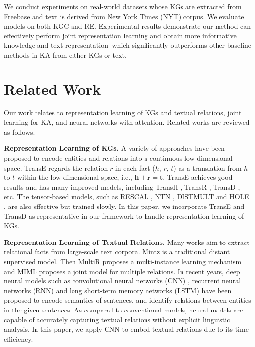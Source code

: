 \documentclass[letterpaper]{article} %
\begin{document}
We conduct experiments on real-world datasets whose KGs are extracted from Freebase and text is derived from New York Times (NYT) corpus. We evaluate models on both KGC and RE. Experimental results demonstrate our method can effectively perform joint representation learning and obtain more informative knowledge and text representation, which significantly outperforms other baseline methods in KA from either KGs or text.

\section{Related Work}
\label{sec:related}
Our work relates to representation learning of KGs and textual relations, joint learning for KA, and neural networks with attention. Related works are reviewed as follows.

\textbf{Representation Learning of KGs.} A variety of approaches have been proposed to encode entities and relations into a continuous low-dimensional space. TransE \cite{bordes2013translating} regards the relation $r$ in each fact ($h$, $r$, $t$) as a translation from $h$ to $t$ within the low-dimensional space, i.e., $\textbf{h} + \textbf{r} = \textbf{t}$. TransE achieves good results and has many improved models, including TransH \cite{wang2014transh}, TransR \cite{lin2015learning}, TransD \cite{ji2015knowledge}, etc. The tensor-based models, such as RESCAL \cite{nickel2011three}, NTN \cite{socher2013reasoning}, DISTMULT \cite{yang2015embedding} and HOLE \cite{nickel2016holographic}, are also effective but trained slowly. In this paper, we incorporate TransE and TransD as representative in our framework to handle representation learning of KGs. 

\textbf{Representation Learning of Textual Relations.} Many works aim to extract relational facts from large-scale text corpora. Mintz \cite{mintz2009distant} is a traditional distant supervised model. Then MultiR \cite{hoffmann2011knowledge} proposes a multi-instance learning mechanism and MIML \cite{surdeanu2012multi} proposes a joint model for multiple relations. In recent years, deep neural models such as convolutional neural networks (CNN) \cite{zeng2014relation,zeng2015distant}, recurrent neural networks (RNN) \cite{zhang2015relation} and long short-term memory networks (LSTM) \cite{xu2015classifying,miwa2016end} have been proposed to encode semantics of sentences, and identify relations between entities in the given sentences. As compared to conventional models, neural models are capable of accurately capturing textual relations without explicit linguistic analysis. In this paper, we apply CNN to embed textual relations due to its time efficiency.
\end{document}
